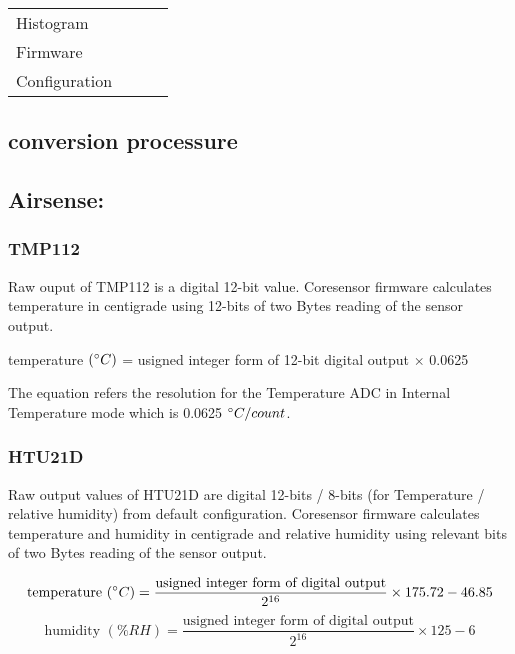 \begin{center}
\begin{longtable}{|l|l|l|l|}
    \hline \rowcolor{white} \multicolumn{4}{|c|}{{Alpha sensor}} \\ \hline
    Histogram & & & \\
    Firmware & & & \\
    Configuration & & & \\
    \hline
\end{longtable}
\end{center}


\subsection{ conversion processure}

\subsection{Airsense:}
\subsubsection{ TMP112} \label{ssec:first}

Raw ouput of TMP112 is a digital 12-bit value. Coresensor firmware calculates temperature in centigrade using 12-bits of two Bytes reading of the sensor output. \\

{\centering
  temperature \((\degree C)\) = usigned integer form of 12-bit digital output $\times$ 0.0625\par
}

\bigbreak
The equation refers the resolution for the Temperature ADC in Internal Temperature mode which is 0.0625 \(\degree C/count\).

\subsubsection{ HTU21D}
Raw output values of HTU21D are digital 12-bits / 8-bits (for Temperature / relative humidity) from default configuration. Coresensor firmware calculates  temperature and humidity in centigrade and relative humidity using relevant bits of two Bytes reading of the sensor output.

{\centering
 \[ \text{temperature \((\degree C)\)} = \frac{\text{usigned integer form of digital output}}{2^{16}} \times 175.72 - 46.85 \] 
 \[ \text{humidity \((\%RH)\)} = \frac{\text{usigned integer form of digital output}}{2^{16}} \times 125 - 6 \]
 \par
 }


